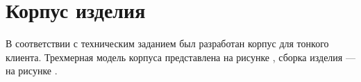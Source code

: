 \section{Корпус изделия}
В соответствии с техническим заданием был разработан корпус для тонкого клиента.
Трехмерная модель корпуса представлена на рисунке , сборка изделия — на рисунке .

